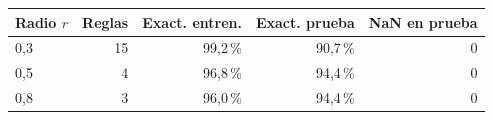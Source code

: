 \begin{tabular}{lrrrr}
\toprule
Radio $r$ & Reglas & Exact. entren. & Exact. prueba & NaN en prueba \\
\midrule
0,3 & 15 & 99,2\,\% & 90,7\,\% & 0 \\
0,5 & 4 & 96,8\,\% & 94,4\,\% & 0 \\
0,8 & 3 & 96,0\,\% & 94,4\,\% & 0 \\
\bottomrule
\end{tabular}
